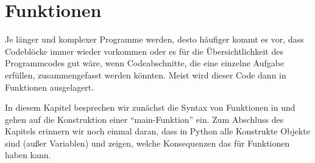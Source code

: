 \section{Funktionen}
\label{section:funktionen}
Je länger und komplexer Programme werden, desto häufiger kommt es vor, dass Codeblöcke immer wieder vorkommen oder 
es für die Übersichtlichkeit des Programmcodes gut wäre, wenn Codeabschnitte, die eine einzelne Aufgabe erfüllen, zusammengefasst 
werden könnten. Meist wird dieser Code dann in Funktionen ausgelagert.

In diesem Kapitel besprechen wir zunächst die Syntax von Funktionen in \Python und gehen auf die Konstruktion einer 
``main-Funktion'' ein. Zum Abschluss des Kapitels erinnern wir noch einmal daran, dass in Python alle Konstrukte Objekte 
sind (außer Variablen) und zeigen, welche Konsequenzen das für Funktionen haben kann. 




